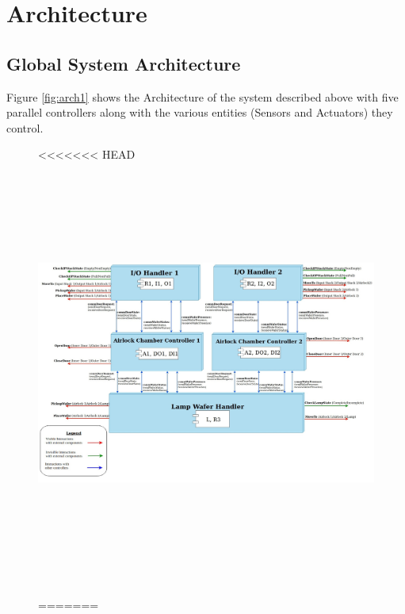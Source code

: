 \documentclass[a4paper,12pt]{article}
\begin{document}
	\section{Architecture}
	\subsection{Global System Architecture}
	Figure \ref{fig:arch1} shows the Architecture of the system described above with five parallel controllers along with the various entities (Sensors and Actuators) they control.\\
	
	\begin{figure}[ht]
		\centerline{
<<<<<<< HEAD
			\includegraphics[width=20cm, height=14cm]{Architecture(last-rot).jpg}}
=======

\end{figure}
\end{document}
